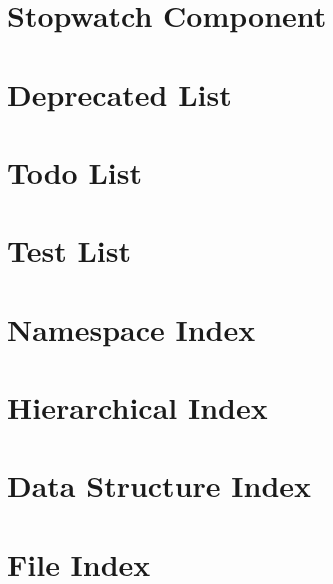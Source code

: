 \let\mypdfximage\pdfximage\def\pdfximage{\immediate\mypdfximage}\documentclass[twoside]{book}
\newcommand{\+}{\discretionary{\mbox{\scriptsize$\hookleftarrow$}}{}{}}
\begin{document}
\chapter{Stopwatch Component}
\label{md_vdlp_redirect_vendor_symfony_stopwatch__r_e_a_d_m_e}

\chapter{Deprecated List}
\label{deprecated}

\chapter{Todo List}
\label{todo}

\chapter{Test List}
\label{test}

\chapter{Namespace Index}

\chapter{Hierarchical Index}

\chapter{Data Structure Index}

\chapter{File Index}

\end{document}
